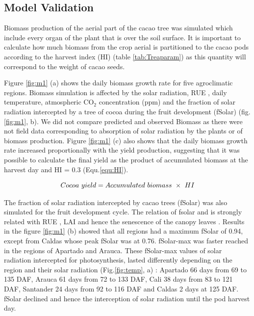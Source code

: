 \documentclass[gene,journal,article,submit,moreauthors,pdftex]{Definitions/mdpi}
\begin{document}
\subsection{Model Validation}

Biomass production of the aerial part of the cacao tree was simulated which include every organ of the plant that is over the soil surface. It is important to calculate how much biomass from the crop aerial is partitioned to the cacao pods according to the harvest index (HI) (table \ref{tab:Treaparam}) as this quantity will correspond to the weight of cacao seeds.  

Figure \ref{fig:m1} (a) shows the daily biomass growth rate for five agroclimatic regions. Biomass simulation is affected by the solar radiation, RUE \citep{Fletcher2013RUE,Bonhomme2000}, daily temperature, atmospheric CO$_{2}$ concentration (ppm) and the fraction of solar radiation intercepted by a tree of cocoa during the fruit development (fSolar) (fig. \ref{fig:m1}, b). We did not compare predicted and observed Biomass as there were not field data corresponding to absorption of solar radiation by the plants or of biomass production. Figure \ref{fig:m1} (c) also shows that the daily biomass growth rate increased proportionally with the yield production, suggesting that it was possible to calculate the final yield as the product of accumulated biomass at the harvest day and HI = 0.3 (Equ.\ref{equ:HI}).

\begin{equation}
Cocoa~yield = Accumulated~ biomass~\times~ HI \\
\label{equ:HI}
\end{equation}


The fraction of solar radiation intercepted by cacao trees (fSolar) was also simulated for the fruit development cycle. The relation of fsolar and is strongly related with RUE \citep{Fletcher2013RUE,Bonhomme2000}, LAI and hence the senescence of the canopy leaves \citep{lahive2019, Danner2015, Soltani2012, Romero2017, Vina2011, Zao2019simple}. Results in the figure \ref{fig:m1} (b) showed that all regions had a maximum fSolar of 0.94, except from Caldas whose peak fSolar was at 0.76.  fSolar-max was faster reached in the regions of Apartado and Arauca. These fSolar-max values of solar radiation intercepted for photosynthesis, lasted differently depending on the region and their solar radiation (Fig.\ref{fig:temp}, a) : Apartado 66 days  from  69 to 135 DAF,  Arauca 61 days from 72 to 133 DAF, Cali 38 days from 83 to 121 DAF,  Santander 24 days from 92 to 116 DAF and Caldas 2 days at 125 DAF. fSolar declined and hence the interception of solar radiation until the pod harvest day. 
\end{document}
